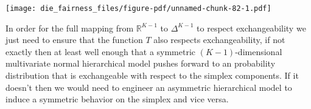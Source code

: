 \documentclass[
  letterpaper,
  DIV=11,
  numbers=noendperiod]{scrartcl}
\newenvironment{Shaded}{\begin{snugshade}}{\end{snugshade}}
\newcommand{\AttributeTok}[1]{\textcolor[rgb]{0.40,0.45,0.13}{#1}}
\newcommand{\ControlFlowTok}[1]{\textcolor[rgb]{0.00,0.23,0.31}{#1}}
\newcommand{\DecValTok}[1]{\textcolor[rgb]{0.68,0.00,0.00}{#1}}
\newcommand{\FloatTok}[1]{\textcolor[rgb]{0.68,0.00,0.00}{#1}}
\newcommand{\FunctionTok}[1]{\textcolor[rgb]{0.28,0.35,0.67}{#1}}
\newcommand{\NormalTok}[1]{\textcolor[rgb]{0.00,0.23,0.31}{#1}}
\newcommand{\OtherTok}[1]{\textcolor[rgb]{0.00,0.23,0.31}{#1}}
\newcommand{\SpecialCharTok}[1]{\textcolor[rgb]{0.37,0.37,0.37}{#1}}
\newcommand{\StringTok}[1]{\textcolor[rgb]{0.13,0.47,0.30}{#1}}
\begin{document}
\begin{Shaded}
\end{Shaded}

\texttt{[image: die\_fairness\_files/figure-pdf/unnamed-chunk-82-1.pdf]}

In order for the full mapping from \(\mathbb{R}^{K - 1}\) to
\(\Delta^{K - 1}\) to respect exchangeability we just need to ensure
that the function \(T\) also respects exchangeability, if not exactly
then at least well enough that a symmetric \((K - 1)\)-dimensional
multivariate normal hierarchical model pushes forward to an probability
distribution that is exchangeable with respect to the simplex
components. If it doesn't then we would need to engineer an asymmetric
hierarchical model to induce a symmetric behavior on the simplex and
vice versa.
\end{document}

